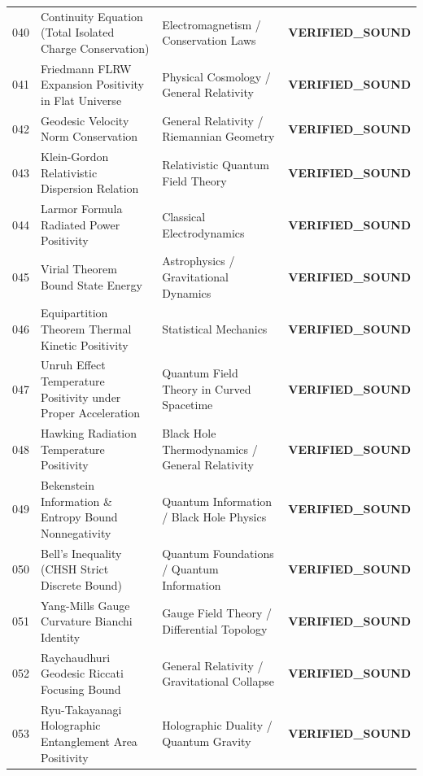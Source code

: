 \documentclass[10pt,a4paper]{article}
\begin{document}
\begin{longtable}{p{0.8cm} p{7.0cm} p{3.8cm} p{3.0cm}}
040 & Continuity Equation (Total Isolated Charge Conservation) & Electromagnetism / Conservation Laws & \textcolor{green!70!black}{\textbf{VERIFIED\_SOUND}} \\
041 & Friedmann FLRW Expansion Positivity in Flat Universe & Physical Cosmology / General Relativity & \textcolor{green!70!black}{\textbf{VERIFIED\_SOUND}} \\
042 & Geodesic Velocity Norm Conservation & General Relativity / Riemannian Geometry & \textcolor{green!70!black}{\textbf{VERIFIED\_SOUND}} \\
043 & Klein-Gordon Relativistic Dispersion Relation & Relativistic Quantum Field Theory & \textcolor{green!70!black}{\textbf{VERIFIED\_SOUND}} \\
044 & Larmor Formula Radiated Power Positivity & Classical Electrodynamics & \textcolor{green!70!black}{\textbf{VERIFIED\_SOUND}} \\
045 & Virial Theorem Bound State Energy & Astrophysics / Gravitational Dynamics & \textcolor{green!70!black}{\textbf{VERIFIED\_SOUND}} \\
046 & Equipartition Theorem Thermal Kinetic Positivity & Statistical Mechanics & \textcolor{green!70!black}{\textbf{VERIFIED\_SOUND}} \\
047 & Unruh Effect Temperature Positivity under Proper Acceleration & Quantum Field Theory in Curved Spacetime & \textcolor{green!70!black}{\textbf{VERIFIED\_SOUND}} \\
048 & Hawking Radiation Temperature Positivity & Black Hole Thermodynamics / General Relativity & \textcolor{green!70!black}{\textbf{VERIFIED\_SOUND}} \\
049 & Bekenstein Information \& Entropy Bound Nonnegativity & Quantum Information / Black Hole Physics & \textcolor{green!70!black}{\textbf{VERIFIED\_SOUND}} \\
050 & Bell's Inequality (CHSH Strict Discrete Bound) & Quantum Foundations / Quantum Information & \textcolor{green!70!black}{\textbf{VERIFIED\_SOUND}} \\
051 & Yang-Mills Gauge Curvature Bianchi Identity & Gauge Field Theory / Differential Topology & \textcolor{green!70!black}{\textbf{VERIFIED\_SOUND}} \\
052 & Raychaudhuri Geodesic Riccati Focusing Bound & General Relativity / Gravitational Collapse & \textcolor{green!70!black}{\textbf{VERIFIED\_SOUND}} \\
053 & Ryu-Takayanagi Holographic Entanglement Area Positivity & Holographic Duality / Quantum Gravity & \textcolor{green!70!black}{\textbf{VERIFIED\_SOUND}} \\

\end{longtable}
\end{document}
